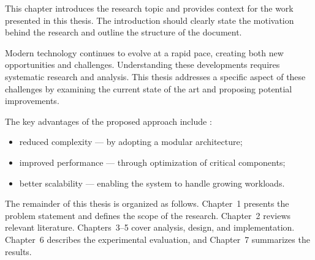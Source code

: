 
This chapter introduces the research topic and provides context for the work presented in this thesis.
The introduction should clearly state the motivation behind the research and outline the structure of the document.

Modern technology continues to evolve at a rapid pace, creating both new opportunities and challenges.
Understanding these developments requires systematic research and analysis.
This thesis addresses a specific aspect of these challenges by examining the current state of the art and proposing potential improvements.

The key advantages of the proposed approach include \cite{sample-ref}:
\begin{itemize}
  \item reduced complexity --- by adopting a modular architecture;
  \item improved performance --- through optimization of critical components;
  \item better scalability --- enabling the system to handle growing workloads.
\end{itemize}

The remainder of this thesis is organized as follows.
Chapter~1 presents the problem statement and defines the scope of the research.
Chapter~2 reviews relevant literature.
Chapters~3--5 cover analysis, design, and implementation.
Chapter~6 describes the experimental evaluation, and Chapter~7 summarizes the results.

\clearpage
